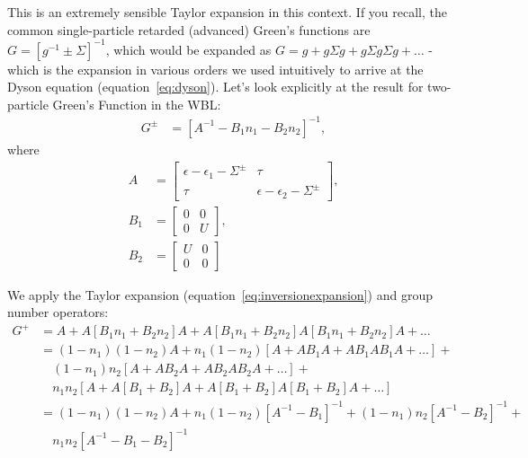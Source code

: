 This is an extremely sensible Taylor expansion in this context. If you recall, the common single-particle retarded (advanced) Green's functions are $G = \left[ g^{-1} \pm \Sigma \right]^{-1}$, which would be expanded as $G = g + g\Sigma g + g\Sigma g\Sigma g + \ldots$ - which is the expansion in various orders we used intuitively to arrive at the Dyson equation (equation~\ref{eq:dyson}). Let's look explicitly at the result for two-particle Green's Function in the WBL:
\begin{align*}
G^\pm  &= \left[ A^{-1} - B_1 n_1 - B_2 n_2 \right]^{-1},
\end{align*}
where 
\begin{align*}
A &= \begin{bmatrix} \epsilon - \epsilon_1 - \Sigma^\pm & \tau \\ 
\tau & \epsilon - \epsilon_2 - \Sigma^\pm \end{bmatrix},\\
B_1 &= \begin{bmatrix} 0 & 0 \\ 0 & U \end{bmatrix},\\
B_2 &= \begin{bmatrix} U & 0 \\ 0 & 0 \end{bmatrix}
\end{align*}

We apply the Taylor expansion (equation~\ref{eq:inversionexpansion}) and group number operators:
\begin{align*}
G^+ &= A + A\left[B_1 n_1 + B_2 n_2\right]A + A\left[B_1 n_1 + B_2 n_2\right]  A\left[B_1 n_1 + B_2 n_2\right]  A + \ldots \\
&= (1-n_1)(1-n_2) A + n_1 (1-n_2)\left[A + AB_1 A + AB_1AB_1A + \ldots \right] + \\
&\quad (1-n_1)n_2 \left[ A + AB_2A + AB_2AB_2A + \ldots \right] +\\
&\quad n_1 n_2 \left[ A + A\left[B_1 + B_2\right]A+ A\left[B_1 + B_2\right]A\left[B_1 + B_2\right]A + \ldots\right] \\
&= (1-n_1)(1-n_2) A + n_1 (1-n_2) \left[ A^{-1} - B_1\right]^{-1} + (1-n_1) n_2 \left[ A^{-1} - B_2\right]^{-1} +\\&\quad n_1 n_2 \left[A^{-1} - B_1 - B_2 \right]^{-1}
\end{align*}


